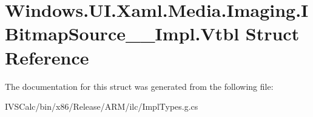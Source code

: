 \hypertarget{struct_windows_1_1_u_i_1_1_xaml_1_1_media_1_1_imaging_1_1_i_bitmap_source_____impl_1_1_vtbl}{}\section{Windows.\+U\+I.\+Xaml.\+Media.\+Imaging.\+I\+Bitmap\+Source\+\_\+\+\_\+\+Impl.\+Vtbl Struct Reference}
\label{struct_windows_1_1_u_i_1_1_xaml_1_1_media_1_1_imaging_1_1_i_bitmap_source_____impl_1_1_vtbl}


The documentation for this struct was generated from the following file\+:\begin{DoxyCompactItemize}
\item 
I\+V\+S\+Calc/bin/x86/\+Release/\+A\+R\+M/ilc/Impl\+Types.\+g.\+cs\end{DoxyCompactItemize}
